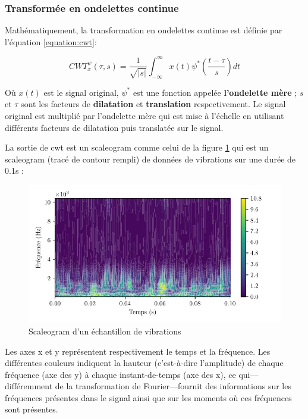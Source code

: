 \subsubsection{Transformée en ondelettes continue}
Mathématiquement, la transformation en ondelettes continue est définie par l'équation \ref{equation:cwt}:

\begin{equation}
    CWT_x^\psi(\tau, s)=\frac{1}{\sqrt{|s|}}\int_{-\infty}^{\infty}x(t)\psi^* \left(\frac{t-\tau}{s}\right)dt
    \label{equation:cwt}
\end{equation}

Où $x(t)$ est le signal original, $\psi^*$ est une fonction appelée \textbf{l'ondelette mère} ; $s$ et $\tau$ sont les facteurs de \textbf{dilatation} et \textbf{translation} respectivement. Le signal original est multiplié par l'ondelette mère qui est mise à l'échelle en utilisant différents facteurs de dilatation puis translatée sur le signal.

La sortie de \acrshort{cwt} est un scaleogram comme celui de la figure \ref{fig:scaleogram} qui est un scaleogram (tracé de contour rempli) de données de vibrations sur une durée de 0.1s :

\begin{figure}[H]
    \centering
    \includegraphics{figures/scaleogram_fr.pdf}
    \caption{Scaleogram d'un échantillon de vibrations}
    \label{fig:scaleogram}
\end{figure}

Les axes x et y représentent respectivement le temps et la fréquence. Les différentes couleurs indiquent la hauteur (c'est-à-dire l'amplitude) de chaque fréquence (axe des y) à chaque instant-de-temps (axe des x), ce qui—différemment de la transformation de Fourier—fournit des informations sur les fréquences présentes dans le signal ainsi que sur les moments où ces fréquences sont présentes.

